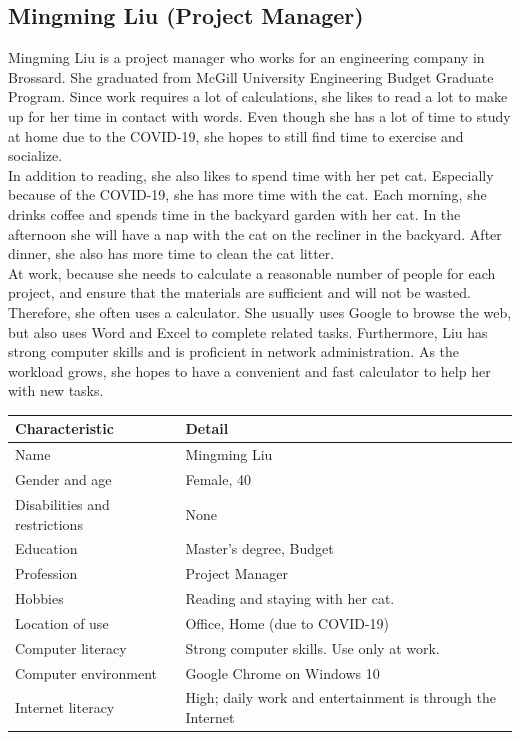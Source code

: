 \documentclass[11pt,onside]{report}
\begin{document}
\subsection{Mingming Liu (Project Manager)}
Mingming Liu is a project manager who works for an engineering company in Brossard. She graduated from McGill University Engineering Budget Graduate Program. Since work requires a lot of calculations, she likes to read a lot to make up for her time in contact with words. Even though she has a lot of time to study at home due to the COVID-19, she hopes to still find time to exercise and socialize. \\

In addition to reading, she also likes to spend time with her pet cat. Especially because of the COVID-19, she has more time with the cat. Each morning, she drinks coffee and spends time in the backyard garden with her cat. In the afternoon she will have a nap with the cat on the recliner in the backyard. After dinner, she also has more time to clean the cat litter. \\

At work, because she needs to calculate a reasonable number of people for each project, and ensure that the materials are sufficient and will not be wasted. Therefore, she often uses a calculator. She usually uses Google to browse the web, but also uses Word and Excel to complete related tasks. Furthermore, Liu has strong computer skills and is proficient in network administration. As the workload grows, she hopes to have a convenient and fast calculator to help her with new tasks.
\begin{center}
    \begin{tabular}{|p{4cm}|p{10cm}|}
        \hline
        \bf{Characteristic} & \bf{Detail} \\
        \hline
        Name &   Mingming Liu \\
        \hline
        Gender and age & Female, 40 \\
        \hline
        Disabilities and restrictions &  None \\
        \hline
        Education & Master's degree, Budget \\
        \hline
        Profession & Project Manager \\
        \hline
        Hobbies & Reading and staying with her cat. \\
        \hline
        Location of use & Office, Home (due to COVID-19) \\
        \hline
        Computer literacy &  Strong computer skills. Use only at work. \\
        \hline
        Computer environment &  Google Chrome on Windows 10 \\
        \hline
        Internet literacy &  High; daily work and entertainment is through the Internet \\
        \hline
    \end{tabular}
\end{center}
\end{document}
